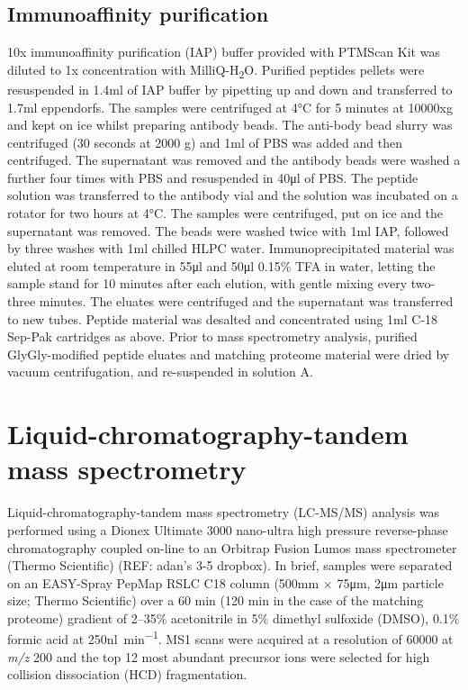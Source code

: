 \subsection{Immunoaffinity purification}
10x immunoaffinity purification (IAP) buffer provided with PTMScan Kit was diluted to 1x concentration with MilliQ-H\textsubscript{2}O.
Purified peptides pellets were resuspended in 1.4\si{\ml} of IAP buffer by pipetting up and down and transferred to 1.7\si{\ml} eppendorfs.
The samples were centrifuged at 4\si{\degreeCelsius} for 5 minutes at 10000xg and kept on ice whilst preparing antibody beads.
The anti-body bead slurry was centrifuged (30 seconds at 2000 g) and 1\si{\ml} of PBS was added and then centrifuged.
The supernatant was removed and the antibody beads were washed a further four times with PBS and resuspended in 40\si{\ul} of PBS.
The peptide solution was transferred to the antibody vial and the solution was incubated on a rotator for two hours at 4\si{\degreeCelsius}.
The samples were centrifuged, put on ice and the supernatant was removed.
The beads were washed twice with 1\si{\ml} IAP, followed by three washes with 1\si{\ml} chilled HLPC water.
Immunoprecipitated material was eluted at room temperature in 55\si{\ul} and 50\si{\ul} 0.15\% TFA in water, letting the sample stand for 10 minutes after each elution, with gentle mixing every two-three minutes.
The eluates were centrifuged and the supernatant was transferred to new tubes.
Peptide material was desalted and concentrated using 1\si{\ml} C-18 Sep-Pak cartridges as above.
Prior to mass spectrometry analysis, purified GlyGly-modified peptide eluates and matching proteome material were dried by vacuum centrifugation, and re-suspended in solution A.
%

\section{Liquid-chromatography-tandem mass spectrometry}
Liquid-chromatography-tandem mass spectrometry (LC-MS/MS) analysis was performed using a Dionex Ultimate 3000 nano-ultra high pressure reverse-phase chromatography coupled on-line to an Orbitrap Fusion Lumos mass spectrometer (Thermo Scientific) (REF: adan's 3-5 dropbox).
In brief, samples were separated on an EASY-Spray PepMap RSLC C18 column (500\si{\mm} × 75\si{\um}, 2\si{\um} particle size; Thermo Scientific) over a 60 min (120 min in the case of the matching proteome) gradient of 2–35\% acetonitrile in 5\% dimethyl sulfoxide (DMSO), 0.1\% formic acid at 250\si{\nano\litre\per\minute}.
MS1 scans were acquired at a resolution of 60000 at \textit{m/z} 200 and the top 12 most abundant precursor ions were selected for high collision dissociation (HCD) fragmentation.

